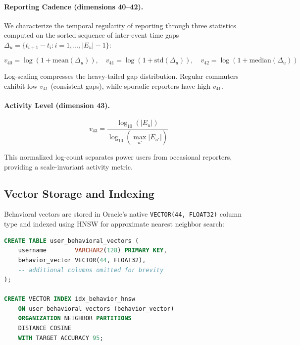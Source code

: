 \documentclass[11pt,a4paper]{article}
\begin{document}
\paragraph{Reporting Cadence (dimensions 40--42).}
We characterize the temporal regularity of reporting through three statistics computed on the sorted sequence of inter-event time gaps $\Delta_u = \{t_{i+1} - t_i : i = 1, \ldots, |E_u|-1\}$:

\begin{equation}
\label{eq:cadence}
v_{40} = \log(1 + \text{mean}(\Delta_u)), \quad v_{41} = \log(1 + \text{std}(\Delta_u)), \quad v_{42} = \log(1 + \text{median}(\Delta_u))
\end{equation}

Log-scaling compresses the heavy-tailed gap distribution. Regular commuters exhibit low $v_{41}$ (consistent gaps), while sporadic reporters have high $v_{41}$.

\paragraph{Activity Level (dimension 43).}

\begin{equation}
\label{eq:activity}
v_{43} = \frac{\log_{10}(|E_u|)}{\log_{10}(\max_{u'} |E_{u'}|)}
\end{equation}

This normalized log-count separates power users from occasional reporters, providing a scale-invariant activity metric.

\subsection{Vector Storage and Indexing}

Behavioral vectors are stored in Oracle's native \texttt{VECTOR(44, FLOAT32)} column type and indexed using HNSW for approximate nearest neighbor search:

\begin{lstlisting}[language=SQL, caption={Vector storage and HNSW index creation.}]
CREATE TABLE user_behavioral_vectors (
    username        VARCHAR2(128) PRIMARY KEY,
    behavior_vector VECTOR(44, FLOAT32),
    -- additional columns omitted for brevity
);

CREATE VECTOR INDEX idx_behavior_hnsw
    ON user_behavioral_vectors (behavior_vector)
    ORGANIZATION NEIGHBOR PARTITIONS
    DISTANCE COSINE
    WITH TARGET ACCURACY 95;
\end{lstlisting}
\end{document}
